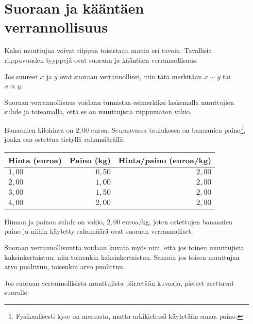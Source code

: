 \chapter{Suoraan ja kääntäen verrannollisuus}

Kaksi muuttujaa voivat riippua toisistaan monin eri tavoin. Tavallisia
riippuvuuden tyyppejä ovat suoraan ja kääntäen verrannollisuus.


Jos suureet $x$ ja $y$ ovat suoraan verrannolliset, niin tätä merkitään $x\sim y$ tai $x\propto y$.

Suoraan verrannollisuus voidaan tunnistaa esimerkiksi laskemalla muuttujien
suhde ja toteamalla, että se on muuttujista riippumaton vakio.

\begin{esimerkki}
Banaanien kilohinta on $2,00$ euroa. Seuraavassa taulukossa on
banaanien paino\footnote{Fysikaalisesti kyse on massasta, mutta
arkikielessä käytetään sanaa paino.}, jonka saa ostettua tietyllä rahamäärällä:
\begin{center} 
\begin{tabular}{|l|r|r|}
\hline
Hinta (euroa) & Paino (kg) & Hinta/paino (euroa/kg) \\
\hline
$1,00$ & $0,50$ & $2,00$ \\
$2,00$ & $1,00$ & $2,00$ \\
$3,00$ & $1,50$ & $2,00$ \\
$4,00$ & $2,00$ & $2,00$ \\
\hline
\end{tabular}
\end{center}
Hinnan ja painon suhde on vakio, $2,00$ euroa/kg, joten ostettujen
banaanien paino ja niihin käytetty rahamäärä ovat suoraan verrannolliset.
\end{esimerkki}

Suoraan verrannollisuutta voidaan kuvata myös niin, että jos
toinen muuttujista kaksinkertaistuu, niin toinenkin kaksinkertaistuu.
Samoin jos toisen muuttujan arvo puolittuu, toisenkin arvo puolittuu.

Jos suoraan verrannollisista muuttujista piirretään kuvaaja, pisteet
asettuvat suoralle:


